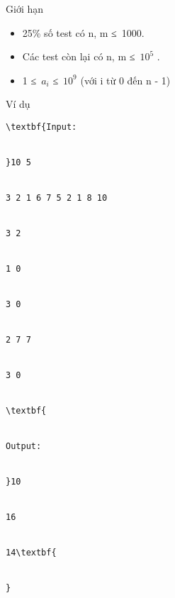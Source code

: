 Giới hạn
\begin{itemize}
	\item     25\% số test có n, m ≤ 1000.   
	\item     Các test còn lại có n, m ≤ $10^{5}$    .   
	\item     1 ≤ $a_{i}$    ≤ $10^{9}$    (với i từ 0 đến n - 1)   
\end{itemize}
Ví dụ
\begin{verbatim}
\textbf{Input:


}10 5


3 2 1 6 7 5 2 1 8 10


3 2


1 0


3 0


2 7 7


3 0


\textbf{


Output:


}10


16


14\textbf{


}\end{verbatim}